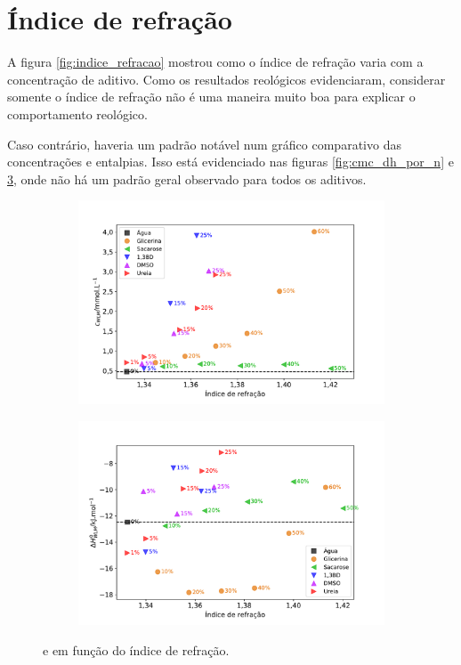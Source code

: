 		\section{Índice de refração}

		A figura \ref{fig:indice_refracao} mostrou como o índice de refração varia com a concentração de aditivo. Como os resultados reológicos evidenciaram, considerar somente o índice de refração não é uma maneira muito boa para explicar o comportamento reológico.
		
		Caso contrário, haveria um padrão notável num gráfico comparativo das concentrações e entalpias. Isso está evidenciado nas figuras \ref{fig:cmc_dh_por_n} e \ref{fig:cwlm_dhwlm_por_n}, onde não há um padrão geral observado para todos os aditivos.
		
		\begin{figure}[h]
			\begin{subfigure}[t]{0.5\textwidth}
				\centering
				\includegraphics[width=\textwidth]{imagens/itc/Cwlm_por_n}
				\caption{\cwlm}
				\label{fig:cwlm_por_n}
			\end{subfigure} %
			\begin{subfigure}[t]{0.5\textwidth}
				\centering
				\includegraphics[width=\textwidth]{imagens/itc/DHwlm_por_n}
				\caption{\DHwlm}
				\label{fig:dhwlm_por_n}
			\end{subfigure}
			
			\caption{\cwlm{} e \DHwlm{} em função do índice de refração.}
			\label{fig:cwlm_dhwlm_por_n}
		\end{figure}
		
